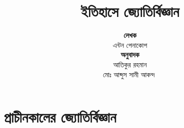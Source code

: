 \documentclass[letterpaper,oneside,openany,12pt]{book}
\title{ইতিহাসে‌‌ জ্যোতির্বিজ্ঞান}
\author{  \textbf{লেখক}\\এন্টন পেনাকোপ\\[5em]
  \textbf{অনুবাদক}\\আতিকুর রহমান\\মোঃ আব্দুস সামী আকন্দ ‌‌}
\date{}
\begin{document}
\maketitle

\thispagestyle{plain}
\begin{center}
\end{center}
\vspace{1.5cm}

\newpage
\tableofcontents
\part{প্রাচীনকালের জ্যোতির্বিজ্ঞান}



‌
‌
\end{document}
